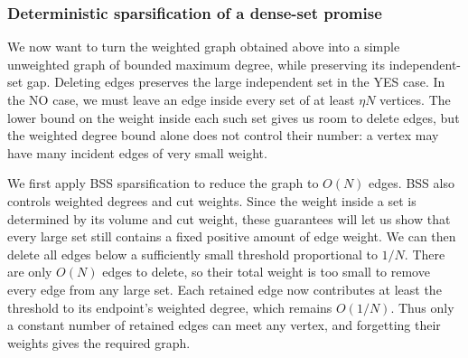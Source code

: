 \subsubsection{Deterministic sparsification of a dense-set promise}

We now want to turn the weighted graph obtained above into a simple
unweighted graph of bounded maximum degree, while preserving its
independent-set gap. Deleting edges preserves the large independent
set in the YES case. In the NO case, we must leave an edge inside
every set of at least $\eta N$ vertices. The lower bound on the
weight inside each such set gives us room to delete edges, but the
weighted degree bound alone does not control their number: a vertex
may have many incident edges of very small weight.

We first apply BSS sparsification to reduce the graph to $O(N)$
edges. BSS also controls weighted degrees and cut weights. Since
the weight inside a set is determined by its volume and cut weight,
these guarantees will let us show that every large set still
contains a fixed positive amount of edge weight. We can then delete
all edges below a sufficiently small threshold proportional to
$1/N$. There are only $O(N)$ edges to delete, so their total weight
is too small to remove every edge from any large set. Each retained
edge now contributes at least the threshold to its endpoint's
weighted degree, which remains $O(1/N)$. Thus only a constant number
of retained edges can meet any vertex, and forgetting their weights
gives the required graph.

